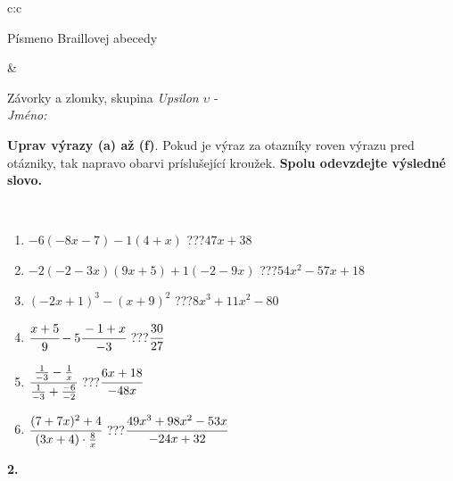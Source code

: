 \documentclass[10pt]{report}
\begin{document}
\begin{tabular}{c:c}
\begin{minipage}[c][104.5mm][t]{0.5\linewidth}
\begin{center}
\begin{minipage}{0.20\linewidth}
\begin{center}
{\small Písmeno Braillovej abecedy}
\end{center}
\end{minipage}
\end{center}
\end{minipage}
&
\begin{minipage}[c][104.5mm][t]{0.5\linewidth}
\begin{center}
\vspace{7mm}
{\huge Závorky a zlomky, skupina \textit{Upsilon $\upsilon$} -}\\[5mm]
\textit{Jméno:}\phantom{xxxxxxxxxxxxxxxxxxxxxxxxxxxxxxxxxxxxxxxxxxxxxxxxxxxxxxxxxxxxxxxxx}\\[5mm]
\begin{minipage}{0.95\linewidth}
\begin{center}
\textbf{Uprav výrazy (a) až (f)}. Pokud je výraz za otazníky roven výrazu pred otázniky, tak napravo obarvi príslušející kroužek. \textbf{Spolu odevzdejte výsledné slovo.}
\end{center}
\end{minipage}
\\[1mm]
\begin{minipage}{0.79\linewidth}
\begin{center}
\begin{varwidth}{\linewidth}
\begin{enumerate}
\normalsize
\item $-6(-8x-7)-1(4+x)$\quad \dotfill\; ???\;\dotfill \quad $47x+38$
\item $-2(-2-3x)(9x+5)+1(-2-9x)$\quad \dotfill\; ???\;\dotfill \quad $54x^2-57x+18$
\item $(-2x+1)^3-(x+9)^2$\quad \dotfill\; ???\;\dotfill \quad $8x^3+11x^2-80$
\item $\cfrac{x+5}{9}-5\cfrac{-1+x}{-3}$\quad \dotfill\; ???\;\dotfill \quad $\cfrac{30}{27}$
\item $\cfrac{\frac{1}{-3}-\frac{1}{x}}{\frac{1}{-3}+\frac{-6}{-2}}$\quad \dotfill\; ???\;\dotfill \quad $\cfrac{6x+18}{-48x}$
\item $\cfrac{(7+7x)^2+4}{(3x+4)\cdot\frac{8}{x}}$\quad \dotfill\; ???\;\dotfill \quad $\cfrac{49x^3+98x^2-53x}{-24x+32}$
\end{enumerate}
\end{varwidth}
\end{center}
\end{minipage}
\begin{minipage}{0.20\linewidth}
\begin{center}
{\Huge\bfseries 2.} \\[2mm]

\end{center}
\end{minipage}
\end{center}
\end{minipage}
\end{tabular}
\end{document}
